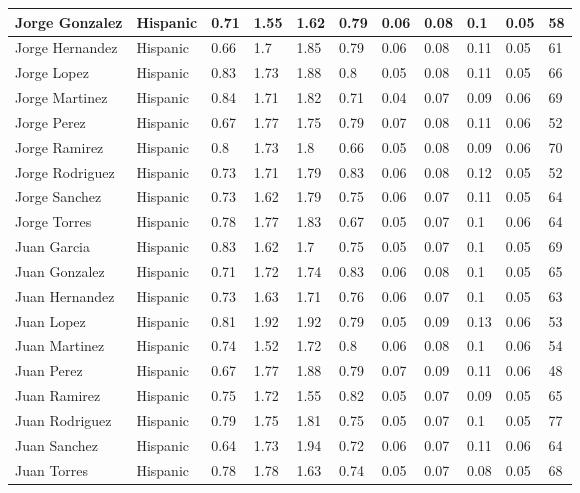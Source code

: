 \begin{table}[!ht]
\begin{tabular}{|l|l|l|l|l|l|l|l|l|l|l|}
        Jorge Gonzalez & Hispanic & 0.71 & 1.55 & 1.62 & 0.79 & 0.06 & 0.08 & 0.1 & 0.05 & 58 \\ \hline
        Jorge Hernandez & Hispanic & 0.66 & 1.7 & 1.85 & 0.79 & 0.06 & 0.08 & 0.11 & 0.05 & 61 \\ \hline
        Jorge Lopez & Hispanic & 0.83 & 1.73 & 1.88 & 0.8 & 0.05 & 0.08 & 0.11 & 0.05 & 66 \\ \hline
        Jorge Martinez & Hispanic & 0.84 & 1.71 & 1.82 & 0.71 & 0.04 & 0.07 & 0.09 & 0.06 & 69 \\ \hline
        Jorge Perez & Hispanic & 0.67 & 1.77 & 1.75 & 0.79 & 0.07 & 0.08 & 0.11 & 0.06 & 52 \\ \hline
        Jorge Ramirez & Hispanic & 0.8 & 1.73 & 1.8 & 0.66 & 0.05 & 0.08 & 0.09 & 0.06 & 70 \\ \hline
        Jorge Rodriguez & Hispanic & 0.73 & 1.71 & 1.79 & 0.83 & 0.06 & 0.08 & 0.12 & 0.05 & 52 \\ \hline
        Jorge Sanchez & Hispanic & 0.73 & 1.62 & 1.79 & 0.75 & 0.06 & 0.07 & 0.11 & 0.05 & 64 \\ \hline
        Jorge Torres & Hispanic & 0.78 & 1.77 & 1.83 & 0.67 & 0.05 & 0.07 & 0.1 & 0.06 & 64 \\ \hline
        Juan Garcia & Hispanic & 0.83 & 1.62 & 1.7 & 0.75 & 0.05 & 0.07 & 0.1 & 0.05 & 69 \\ \hline
        Juan Gonzalez & Hispanic & 0.71 & 1.72 & 1.74 & 0.83 & 0.06 & 0.08 & 0.1 & 0.05 & 65 \\ \hline
        Juan Hernandez & Hispanic & 0.73 & 1.63 & 1.71 & 0.76 & 0.06 & 0.07 & 0.1 & 0.05 & 63 \\ \hline
        Juan Lopez & Hispanic & 0.81 & 1.92 & 1.92 & 0.79 & 0.05 & 0.09 & 0.13 & 0.06 & 53 \\ \hline
        Juan Martinez & Hispanic & 0.74 & 1.52 & 1.72 & 0.8 & 0.06 & 0.08 & 0.1 & 0.06 & 54 \\ \hline
        Juan Perez & Hispanic & 0.67 & 1.77 & 1.88 & 0.79 & 0.07 & 0.09 & 0.11 & 0.06 & 48 \\ \hline
        Juan Ramirez & Hispanic & 0.75 & 1.72 & 1.55 & 0.82 & 0.05 & 0.07 & 0.09 & 0.05 & 65 \\ \hline
        Juan Rodriguez & Hispanic & 0.79 & 1.75 & 1.81 & 0.75 & 0.05 & 0.07 & 0.1 & 0.05 & 77 \\ \hline
        Juan Sanchez & Hispanic & 0.64 & 1.73 & 1.94 & 0.72 & 0.06 & 0.07 & 0.11 & 0.06 & 64 \\ \hline
        Juan Torres & Hispanic & 0.78 & 1.78 & 1.63 & 0.74 & 0.05 & 0.07 & 0.08 & 0.05 & 68 \\ \hline

\end{tabular}
\end{table}
